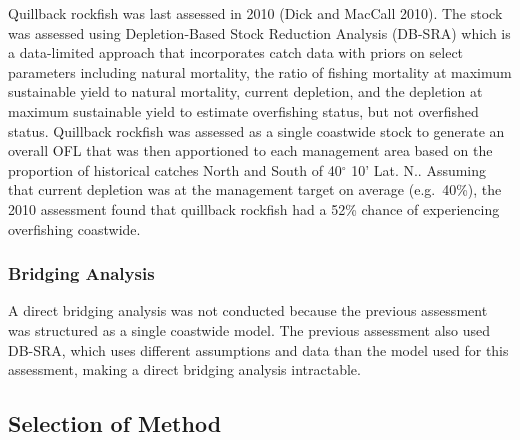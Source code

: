 \documentclass[11pt,
  english,
  letterpaper,
]{article}
\begin{document}
\leavevmode\tagmcend\tagstructend


Quillback rockfish was last assessed in 2010 {(Dick and MacCall 2010)\leavevmode\tagmcend\tagstructend}. The stock was assessed using Depletion-Based Stock Reduction Analysis (DB-SRA) which is a data-limited approach that incorporates catch data with priors on select parameters including natural mortality, the ratio of fishing mortality at maximum sustainable yield to natural mortality, current depletion, and the depletion at maximum sustainable yield to estimate overfishing status, but not overfished status. Quillback rockfish was assessed as a single coastwide stock to generate an overall OFL that was then apportioned to each management area based on the proportion of historical catches North and South of 40{\(^\circ\)\leavevmode\tagmcend\tagstructend} 10' Lat. N.. Assuming that current depletion was at the management target on average (e.g.~40\%), the 2010 assessment found that quillback rockfish had a 52\% chance of experiencing overfishing coastwide.

\leavevmode\tagmcend\tagstructend\par


\hypertarget{bridging-analysis}{%
\subsubsection{Bridging Analysis}\label{bridging-analysis}}

\leavevmode\tagmcend\tagstructend


A direct bridging analysis was not conducted because the previous assessment was structured as a single coastwide model. The previous assessment also used DB-SRA, which uses different assumptions and data than the model used for this assessment, making a direct bridging analysis intractable.

\leavevmode\tagmcend\tagstructend\par


\hypertarget{selection-of-method}{%
\subsection{Selection of Method}\label{selection-of-method}}
\end{document}
